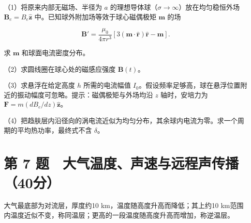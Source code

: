 \documentclass[12pt,a4paper,fontset=fandol]{ctexart}
\begin{document}
（1）将原来内部无磁场、半径为 \(a\)
的理想导体球（\(\sigma\to\infty\)）放在均匀稳恒外场
\(\boldsymbol B_e=B_e\hat{\boldsymbol z}\)
中。已知球外附加场等效于球心磁偶极矩 \(\boldsymbol m\) 的场

\[\boldsymbol B'=\frac{\mu_0}{4\pi r^3}
[3(\boldsymbol m\cdot\hat{\boldsymbol r})\hat{\boldsymbol r}-\boldsymbol m].\]

求 \(\boldsymbol m\) 和球面电流密度分布。

（2）求圆线圈在球心处的磁感应强度 \(\boldsymbol B(t)\)。

（3）求悬浮在给定高度 \(h\) 所需的电流幅值
\(I_0\)。假设频率足够高，球在悬浮位置附近的振动幅度可忽略。提示：磁偶极矩与外场均沿
\(z\) 轴时，安培力为 \(\boldsymbol F=m(dB_e/dz)\hat{\boldsymbol z}\)。

（4）把趋肤层内沿径向的涡电流近似为均匀分布，其余球内电流为零。求一个周期的平均热功率，最终式不含
\(\delta\)。

\clearpage

\section{第 7
题　大气温度、声速与远程声传播（40分）}\label{ux7b2c-7-ux9898-ux5927ux6c14ux6e29ux5ea6ux58f0ux901fux4e0eux8fdcux7a0bux58f0ux4f20ux64ad40ux5206}

大气最底部为对流层，厚度约10 km，温度随高度升高而降低；其上约10
km范围内温度近似不变，称同温层；更高的一段温度随高度升高而增加，称逆温层。

\begin{center}
\begin{minipage}{\linewidth}
\centering\begingroup{}
\ifdim\wd\diagrambox>.88\linewidth
\sbox{\diagrambox}{\resizebox{.88\linewidth}{!}{\usebox{\diagrambox}}}\fi
\ifdim\ht\diagrambox>.38\textheight
\resizebox{!}{.38\textheight}{\usebox{\diagrambox}}
\else\usebox{\diagrambox}\fi
\par{}\endgroup\end{minipage}\end{center}
\end{document}
